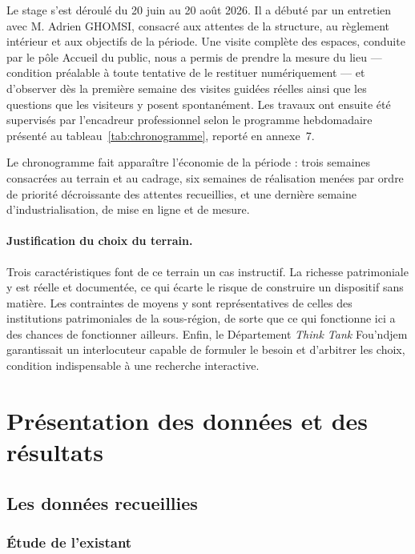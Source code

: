 Le stage s'est déroulé du 20 juin au 20 août 2026. Il a débuté par un entretien
avec M. Adrien GHOMSI, consacré aux attentes de la structure, au règlement
intérieur et aux objectifs de la période. Une visite complète des espaces,
conduite par le pôle Accueil du public, nous a permis de prendre la mesure du
lieu — condition préalable à toute tentative de le restituer numériquement — et
d'observer dès la première semaine des visites guidées réelles ainsi que les
questions que les visiteurs y posent spontanément. Les travaux ont ensuite été
supervisés par l'encadreur professionnel selon le programme hebdomadaire
présenté au tableau~\ref{tab:chronogramme}, reporté en annexe~7.


Le chronogramme fait apparaître l'économie de la période : trois semaines
consacrées au terrain et au cadrage, six semaines de réalisation menées par
ordre de priorité décroissante des attentes recueillies, et une dernière
semaine d'industrialisation, de mise en ligne et de mesure.

\paragraph{Justification du choix du terrain.} Trois caractéristiques font de
ce terrain un cas instructif. La richesse patrimoniale y est réelle et
documentée, ce qui écarte le risque de construire un dispositif sans matière.
Les contraintes de moyens y sont représentatives de celles des institutions
patrimoniales de la sous-région, de sorte que ce qui fonctionne ici a des
chances de fonctionner ailleurs. Enfin, le Département \emph{Think Tank}
Fou'ndjem garantissait un interlocuteur capable de formuler le besoin et
d'arbitrer les choix, condition indispensable à une recherche interactive.

\section{Présentation des données et des résultats}
\label{sec:donnees}

\subsection{Les données recueillies}

\subsubsection{Étude de l'existant}

